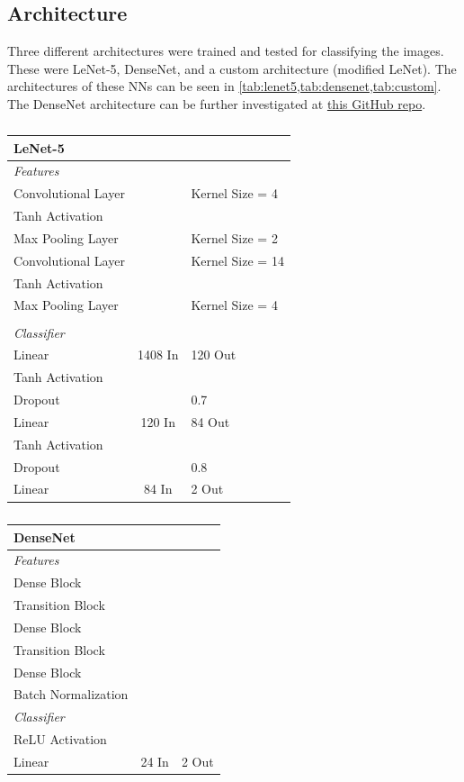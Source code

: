\documentclass[manuscript,screen,review]{acmart}
\begin{document}
\subsection{Architecture}

Three different architectures were trained and tested for classifying the images. These were LeNet-5, DenseNet, and a custom architecture (modified LeNet). The architectures of these NNs can be seen in \cref{tab:lenet5,tab:densenet,tab:custom}. The DenseNet architecture can be further investigated at \href{https://github.com/andreasveit/densenet-pytorch}{this GitHub repo}. 


\begin{table}[h!]
  \caption{}
  \label{tab:lenet5}
  \begin{tabular}{lcl}
    \textbf{LeNet-5} \\
    \toprule
    \textit{Features} \\
    \midrule
    Convolutional Layer &  & Kernel Size = 4 \\
    Tanh Activation & & \\
    Max Pooling Layer & & Kernel Size = 2\\
    Convolutional Layer &  & Kernel Size = 14 \\
    Tanh Activation & & \\
    Max Pooling Layer & & Kernel Size = 4\\
     & & \\
    \textit{Classifier} \\
    \midrule
    Linear & 1408 In & 120 Out\\
    Tanh Activation & & \\
    Dropout & & 0.7 \\
    Linear & 120 In & 84 Out\\
    Tanh Activation & & \\
    Dropout & & 0.8 \\
    Linear & 84 In & 2 Out\\
  \bottomrule
\end{tabular}
\end{table}


\begin{table}[h!]
\caption{}
  \label{tab:densenet}
  \begin{tabular}{lcl}
    \textbf{DenseNet} \\
    \toprule
    \textit{Features} \\
    \midrule
    Dense Block &  &  \\
    Transition Block & & \\
    Dense Block &  &  \\
    Transition Block & & \\
    Dense Block &  &  \\
    Batch Normalization & & \\
    \textit{Classifier} \\
    \midrule
    ReLU Activation &  & \\
    Linear & 24 In & 2 Out\\
    \bottomrule
\end{tabular}
\end{table}
\end{document}
